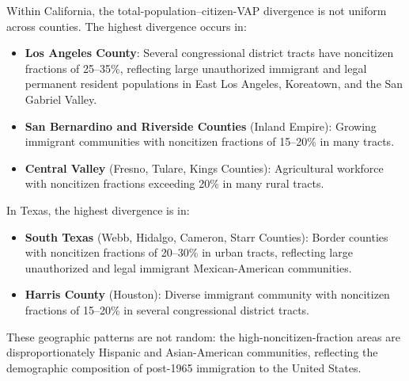 Within California, the total-population--citizen-VAP divergence is not uniform across counties. The highest divergence occurs in:
\begin{itemize}
    \item \textbf{Los Angeles County}: Several congressional district tracts have noncitizen fractions of 25--35\%, reflecting large unauthorized immigrant and legal permanent resident populations in East Los Angeles, Koreatown, and the San Gabriel Valley.
    \item \textbf{San Bernardino and Riverside Counties} (Inland Empire): Growing immigrant communities with noncitizen fractions of 15--20\% in many tracts.
    \item \textbf{Central Valley} (Fresno, Tulare, Kings Counties): Agricultural workforce with noncitizen fractions exceeding 20\% in many rural tracts.
\end{itemize}

In Texas, the highest divergence is in:
\begin{itemize}
    \item \textbf{South Texas} (Webb, Hidalgo, Cameron, Starr Counties): Border counties with noncitizen fractions of 20--30\% in urban tracts, reflecting large unauthorized and legal immigrant Mexican-American communities.
    \item \textbf{Harris County} (Houston): Diverse immigrant community with noncitizen fractions of 15--20\% in several congressional district tracts.
\end{itemize}

These geographic patterns are not random: the high-noncitizen-fraction areas are disproportionately Hispanic and Asian-American communities, reflecting the demographic composition of post-1965 immigration to the United States.
